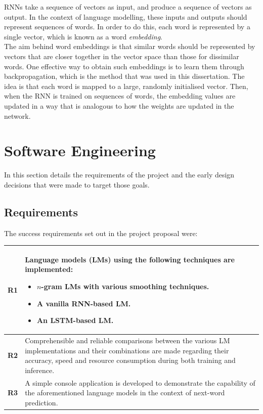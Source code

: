 \documentclass[a4paper, 12pt]{report}
\newcommand{\tbf}[1]{\textbf{#1}}
\newcommand{\tit}[1]{\textit{#1}}
\begin{document}
RNNs take a sequence of vectors as input, and produce a sequence of vectors as output. In the context of language modelling, these inputs and outputs should represent sequences of words. In order to do this, each word is represented by a single vector, which is known as a word \tit{embedding}. \\

The aim behind word embeddings is that similar words should be represented by vectors that are closer together in the vector space than those for dissimilar words. One effective way to obtain such embeddings is to learn them through backpropagation, which is the method that was used in this dissertation. The idea is that each word is mapped to a large, randomly initialised vector. Then, when the RNN is trained on sequences of words, the embedding values are updated in a way that is analogous to how the weights are updated in the network.

\section{Software Engineering}

In this section details the requirements of the project and the early design decisions that were made to target those goals.

\subsection{Requirements}

The success requirements set out in the project proposal were:

\begin{center}
\begin{tabular}{L{1cm} L{14cm}}
	\hline
	\tbf{R1} & Language models (LMs) using the following techniques are implemented:
	\begin{itemize}[nosep]
	\item
		$n$-gram LMs with various smoothing techniques.
	\item
		A vanilla RNN-based LM.
	\item
		An LSTM-based LM.
	\end{itemize}\\[-\normalbaselineskip] \hline
	\tbf{R2} & Comprehensible and reliable comparisons between the various LM implementations and their combinations are made regarding their accuracy, speed and resource consumption during both training and inference. \\ \hline
	\tbf{R3} & A simple console application is developed to demonstrate the capability of the aforementioned language models in the context of next-word prediction. \\ \hline
\end{tabular}
\end{center}
\end{document}
